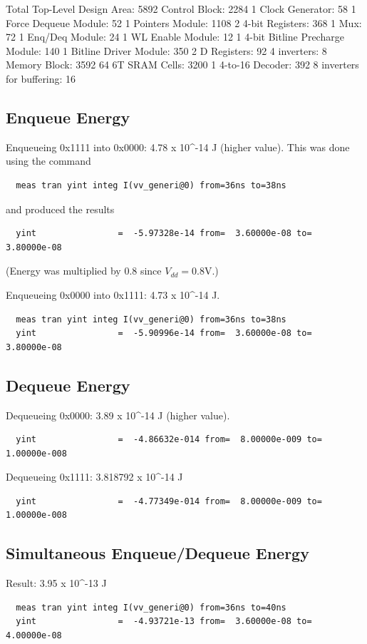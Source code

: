 \documentclass[12pt]{report}
\begin{document}
  Total Top-Level Design Area: 5892
    Control Block: 2284
      1 Clock Generator: 58
      1 Force Dequeue Module: 52
      1 Pointers Module: 1108
      2 4-bit Registers: 368
      1 Mux: 72
      1 Enq/Deq Module: 24
      1 WL Enable Module: 12
      1 4-bit Bitline Precharge Module: 140
      1 Bitline Driver Module: 350
      2 D Registers: 92
      4 inverters: 8
    Memory Block: 3592
      64 6T SRAM Cells: 3200
      1 4-to-16 Decoder: 392
    8 inverters for buffering: 16

\subsection*{Enqueue Energy}
  Enqueueing 0x1111 into 0x0000: 4.78 x 10^-14 J (higher value). This was done using the command 
  \begin{verbatim}
  meas tran yint integ I(vv_generi@0) from=36ns to=38ns
  \end{verbatim}
  and produced the results
  \begin{verbatim}
  yint                =  -5.97328e-14 from=  3.60000e-08 to=  3.80000e-08
  \end{verbatim}
  (Energy was multiplied by 0.8 since $V_{dd} = 0.8 $V.)

  Enqueueing 0x0000 into 0x1111: 4.73 x 10^-14 J.
  \begin{verbatim}
  meas tran yint integ I(vv_generi@0) from=36ns to=38ns
  yint                =  -5.90996e-14 from=  3.60000e-08 to=  3.80000e-08
  \end{verbatim}
\subsection*{Dequeue Energy}
  Dequeueing 0x0000: 3.89 x 10^-14 J (higher value).
  \begin{verbatim}
  yint                =  -4.86632e-014 from=  8.00000e-009 to=  1.00000e-008
  \end{verbatim}
  Dequeueing 0x1111: 3.818792 x 10^-14 J 
  \begin{verbatim}
  yint                =  -4.77349e-014 from=  8.00000e-009 to=  1.00000e-008
  \end{verbatim}
\subsection*{Simultaneous Enqueue/Dequeue Energy}
  Result: 3.95 x 10^-13 J
  \begin{verbatim}
  meas tran yint integ I(vv_generi@0) from=36ns to=40ns
  yint                =  -4.93721e-13 from=  3.60000e-08 to=  4.00000e-08
  \end{verbatim}
\end{document}
